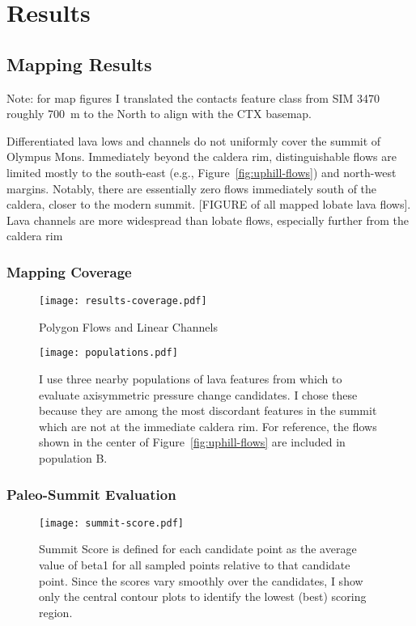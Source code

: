 \chapter{Results}

\section{Mapping Results}

Note: for map figures I translated the contacts feature class from SIM 3470 roughly \qty{700}{\m} to the North to align with the \ac{CTX} basemap.

Differentiated lava lows and channels do not uniformly cover the summit of Olympus Mons. Immediately beyond the caldera rim, distinguishable flows are limited mostly to the south-east (e.g., Figure~\ref{fig:uphill-flows}) and north-west margins. Notably, there are essentially zero flows immediately south of the caldera, closer to the modern summit. [FIGURE of all mapped lobate lava flows]. Lava channels are more widespread than lobate flows, especially further from the caldera rim 

\subsection{Mapping Coverage}

\begin{figure}
    \texttt{[image: results-coverage.pdf]}%
    \caption[Mapping Coverage]{Polygon Flows and Linear Channels}%
    \label{fig:results-coverage}
\end{figure}

\begin{figure}
    \texttt{[image: populations.pdf]}%
    \caption[Sample Populations for Inflation Center Evaluation]{I use three nearby populations of lava features from which to evaluate axisymmetric pressure change candidates. I chose these because they are among the most discordant features in the summit which are not at the immediate caldera rim. For reference, the flows shown in the center of Figure~\ref{fig:uphill-flows} are included in population B.}%
    \label{fig:populations}
\end{figure}

\subsection{Paleo-Summit Evaluation}
\begin{figure}
    \texttt{[image: summit-score.pdf]}%
    \caption[Paleo-Summit Evaluation]{Summit Score is defined for each candidate point as the average value of \acs{beta1} for all sampled points relative to that candidate point. Since the scores vary smoothly over the candidates, I show only the central contour plots to identify the lowest (best) scoring region.}%
    \label{fig:summit-score}
\end{figure}

